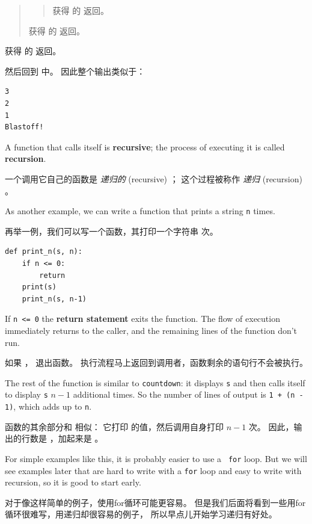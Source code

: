 {{{{\begin{quote}
\begin{quote}
获得  的  返回。
\end{quote}

获得  的  返回。
\end{quote}

获得  的  返回。

然后回到  中。 因此整个输出类似于：

\begin{lstlisting}
3
2
1
Blastoff!
\end{lstlisting}

%
A function that calls itself is {\bf recursive}; the process of
executing it is called {\bf recursion}.

一个调用它自己的函数是 {\em 递归的} (recursive) ；
这个过程被称作 {\em 递归} (recursion) 。
  
  

As another example, we can write a function that prints a
string {\tt n} times.

再举一例，我们可以写一个函数，其打印一个字符串  次。

\begin{lstlisting}
def print_n(s, n):
    if n <= 0:
        return
    print(s)
    print_n(s, n-1)
\end{lstlisting}

%
If {\tt n <= 0} the {\bf return statement} exits the function.  The
flow of execution immediately returns to the caller, and the remaining
lines of the function don't run.

如果  ， 退出函数。
执行流程马上返回到调用者，函数剩余的语句行不会被执行。
  

The rest of the function is similar to {\tt countdown}: it displays
{\tt s} and then calls itself to display {\tt s} $n-1$ additional
times.  So the number of lines of output is {\tt 1 + (n - 1)}, which
adds up to {\tt n}.

函数的其余部分和  相似： 它打印  的值，然后调用自身打印  $n-1$ 次。 因此，输出的行数是  ，加起来是 。

For simple examples like this, it is probably easier to use a {\tt
for} loop.  But we will see examples later that are hard to write
with a {\tt for} loop and easy to write with recursion, so it is
good to start early.

对于像这样简单的例子，使用for循环可能更容易。
但是我们后面将看到一些用for循环很难写，用递归却很容易的例子，
所以早点儿开始学习递归有好处。
  


}}}}
